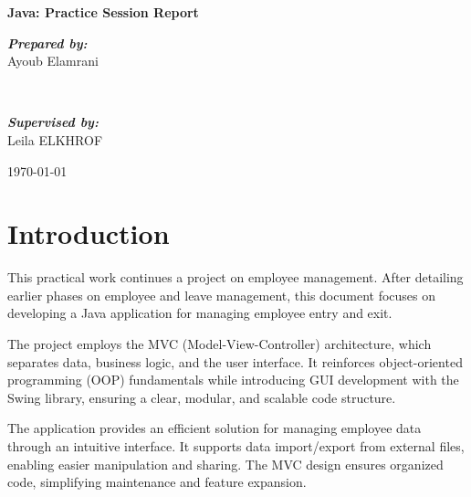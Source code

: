 \documentclass[12pt]{article}
\begin{document}
\begin{titlepage}
    \thispagestyle{empty}

        \vspace*{2cm}
        \Huge\textbf{\textcolor{centrale_red}{Java: Practice Session Report}} \\
        \vspace{1cm}

        \begin{minipage}{0.4\textwidth}
                \begin{flushleft} \large
                    \emph{\textbf{Prepared by:}}\\ 
                    Ayoub Elamrani
                \end{flushleft}
            \end{minipage}
            ~
            \begin{minipage}{0.4\textwidth}
                \begin{flushright} \large
					\emph{\textbf{Supervised by:}}\\
                    Leila ELKHROF
                \end{flushright}
            \end{minipage}

        \vfill
        \large{\today}
\end{titlepage}

\newpage

\tableofcontents

\newpage

\section{Introduction}
This practical work continues a project on employee management. After detailing earlier phases on employee and leave management, this document focuses on developing a Java application for managing employee entry and exit.

The project employs the MVC (Model-View-Controller) architecture, which separates data, business logic, and the user interface. It reinforces object-oriented programming (OOP) fundamentals while introducing GUI development with the Swing library, ensuring a clear, modular, and scalable code structure.

The application provides an efficient solution for managing employee data through an intuitive interface. It supports data import/export from external files, enabling easier manipulation and sharing. The MVC design ensures organized code, simplifying maintenance and feature expansion.
\end{document}
